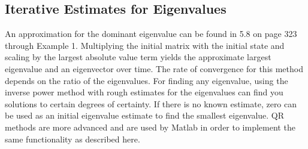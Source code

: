 \documentclass[12pt]{article}
\begin{document}
\subsection{Iterative Estimates for Eigenvalues}
An approximation for the dominant eigenvalue can be found in 5.8 on page 323 through Example 1. Multiplying the initial matrix with the initial state and scaling by the largest absolute 
value term yields the approximate largest eigenvalue and an eigenvector over time. The rate of convergence for this method depends on the ratio of the eigenvalues. For finding any eigenvalue, 
using the inverse power method with rough estimates for the eigenvalues can find you solutions to certain degrees of certainty. If there is no known estimate, zero can be used as an initial 
eigenvalue estimate to find the smallest eigenvalue. QR methods are more advanced and are used by Matlab in order to implement the same functionality as described here. 
\end{document}
